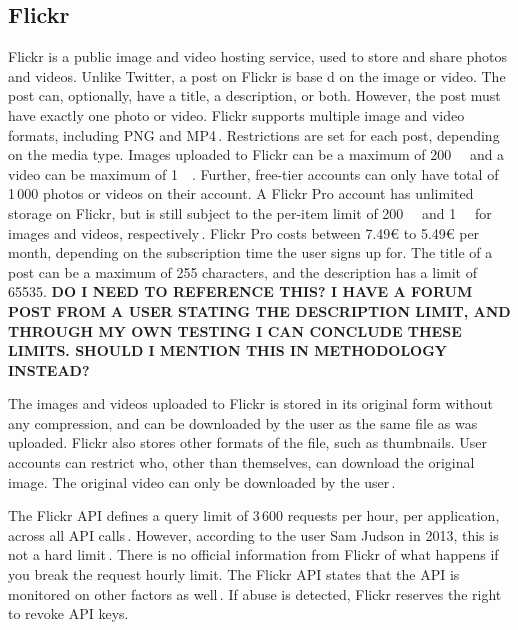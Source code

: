 \subsection{Flickr}
\label{subsec:ows_flickr}
Flickr is a public image and video hosting service, used to store and share photos and videos. Unlike Twitter, a post on Flickr is base d on the image or video. The post can, optionally, have a title, a description, or both. However, the post must have exactly one photo or video. Flickr supports multiple image and video formats, including PNG and MP4\,\cite{FlickrUploadRequirements2022}. Restrictions are set for each post, depending on the media type. Images uploaded to Flickr can be a maximum of \SI{200}{\mega\byte} and a video can be maximum of \SI{1}{\giga\byte}. Further, free-tier accounts can only have total of 1\,000 photos or videos on their account. A Flickr Pro account has unlimited storage on Flickr, but is still subject to the per-item limit of \SI{200}{\mega\byte} and \SI{1}{\giga\byte} for images and videos, respectively\,\cite{flickrUpgradeEverythingYou}. Flickr Pro costs between 7.49€ to 5.49€ per month, depending on the subscription time the user signs up for. The title of a post can be a maximum of 255 characters, and the description has a limit of 65535. \textbf{DO I NEED TO REFERENCE THIS? I HAVE A FORUM POST FROM A USER STATING THE DESCRIPTION LIMIT, AND THROUGH MY OWN TESTING I CAN CONCLUDE THESE LIMITS. SHOULD I MENTION THIS IN METHODOLOGY INSTEAD?}

The images and videos uploaded to Flickr is stored in its original form without any compression, and can be downloaded by the user as the same file as was uploaded\cite{flickrDownloadPermissions}. Flickr also stores other formats of the file, such as thumbnails. User accounts can restrict who, other than themselves, can download the original image. The original video can only be downloaded by the user\,\cite{flickrDownloadPermissions}.

The Flickr API defines a query limit of 3\,600 requests per hour, per application, across all API calls\,\cite{flickrFlickrFlickrDeveloper}. However, according to the user Sam Judson in 2013, this is not a hard limit\,\cite{WhatAreAPI2013}. There is no official information from Flickr of what happens if you break the request hourly limit. The Flickr API states that the API is monitored on other factors as well\,\cite{flickrFlickrFlickrDeveloper}. If abuse is detected, Flickr reserves the right to revoke API keys.